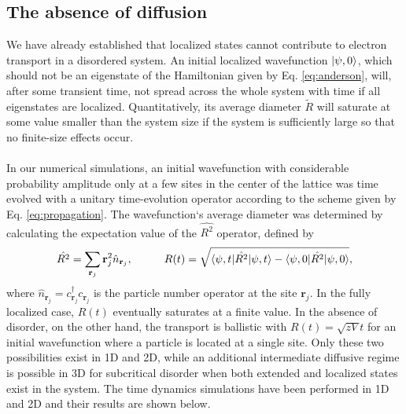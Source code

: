 \documentclass[10pt,a4paper]{article}
\begin{document}
\subsection{The absence of diffusion}
We have already established that localized states cannot contribute to electron transport in a disordered system. An initial localized wavefunction $\vert\psi, 0\rangle$, which should not be an eigenstate of the Hamiltonian given by Eq. \eqref{eq:anderson}, will, after some transient time, not spread across the whole system with time if all eigenstates are localized. Quantitatively, its average diameter $\tilde{R}$ will saturate at some value smaller than the system size if the system is sufficiently large so that no finite-size effects occur.\\\\
\noindent 
In our numerical simulations, an initial wavefunction with considerable probability amplitude only at a few sites in the center of the lattice was time evolved with a unitary time-evolution operator according to the scheme given by Eq. \eqref{eq:propagation}. The wavefunction`s average diameter was determined by calculating the expectation value of the $\hat{R^2}$ operator, defined by
\begin{equation}\label{eq:spread}
\hat{R^2}=\sum\limits_{\mathbf{r}_j} \mathbf{r}_j^2 \hat{n}_{\mathbf{r}_j}, \hspace{10mm} R(t)=\sqrt{\bra{\psi,t} \hat{R^2}\ket{\psi,t}-\bra{\psi,0} \hat{R^2}\ket{\psi,0}},
\end{equation}
where $\hat{n}_{\mathbf{r}_j}=c^\dagger_{\mathbf{r}_j}c_{\mathbf{r}_j}$ is the particle number operator at the site $\mathbf{r}_j$. In the fully localized case, $R(t)$ eventually saturates at a finite value. In the absence of disorder, on the other hand, the transport is ballistic with $R(t)=\sqrt{zV}t$ for an initial wavefunction where a particle is located at a single site. Only these two possibilities exist in 1D and 2D, while an additional intermediate diffusive regime is possible in 3D for subcritical disorder when both extended and localized states exist in the system. The time dynamics simulations have been performed in 1D and 2D and their results are shown below.   \\\\
\noindent 
\end{document}
